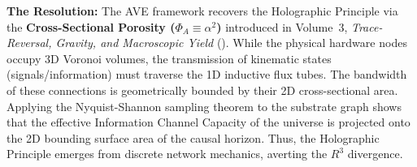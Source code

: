 \textbf{The Resolution:} The AVE framework recovers the Holographic Principle via the \textbf{Cross-Sectional Porosity ($\Phi_A \equiv \alpha^2$)} introduced in Volume~3, \emph{Trace-Reversal, Gravity, and Macroscopic Yield} (). While the physical hardware nodes occupy 3D Voronoi volumes, the transmission of kinematic states (signals/information) must traverse the 1D inductive flux tubes. The bandwidth of these connections is geometrically bounded by their 2D cross-sectional area. Applying the Nyquist-Shannon sampling theorem to the substrate graph shows that the effective Information Channel Capacity of the universe is projected onto the 2D bounding surface area of the causal horizon. Thus, the Holographic Principle emerges from discrete network mechanics, averting the $R^3$ divergence.

